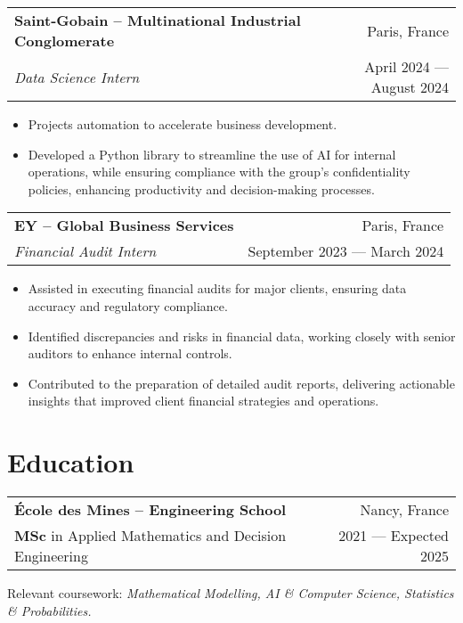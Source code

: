 \documentclass[a4paper,9pt]{extarticle}
\begin{document}
\begin{tabularx}{\textwidth}{@{}Xr@{}}
\textbf{Saint-Gobain -- Multinational Industrial Conglomerate} & Paris, France\\
\textit{Data Science Intern} & April 2024 — August 2024\\
\end{tabularx}
\vspace{-5pt}
\begin{itemize} \itemsep -1pt
    \item Projects automation to accelerate business development.
    \item Developed a Python library to streamline the use of AI for internal operations, while ensuring compliance with the group’s confidentiality policies, enhancing productivity and decision-making processes.
\end{itemize}

\vspace{7pt} %
\noindent
\begin{tabularx}{\textwidth}{@{}Xr@{}}
\textbf{EY -- Global Business Services} & Paris, France\\
\textit{Financial Audit Intern} & September 2023 — March 2024\\
\end{tabularx}
\vspace{-5pt}
\begin{itemize} \itemsep -1pt
    \item Assisted in executing financial audits for major clients, ensuring data accuracy and regulatory compliance.
    \item Identified discrepancies and risks in financial data, working closely with senior auditors to enhance internal controls.
    \item Contributed to the preparation of detailed audit reports, delivering actionable insights that improved client financial strategies and operations.
\end{itemize}

\section*{Education}

\begin{tabularx}{\textwidth}{@{}Xr@{}}
\textbf{École des Mines -- Engineering School} & Nancy, France\\
\textbf{MSc} in Applied Mathematics and Decision Engineering & 2021 — Expected 2025\\
\end{tabularx}
\vspace{-5pt}
Relevant coursework: \textit{Mathematical Modelling, AI \& Computer Science, Statistics \& Probabilities.}
\end{document}
